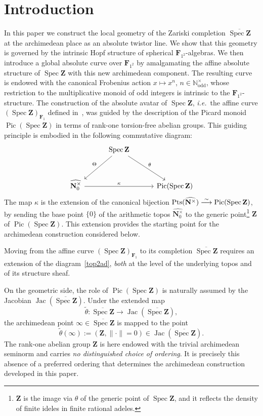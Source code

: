 \documentclass[11pt,a4paper]{article}
\newcommand{\N}{\mathbf{N}}
\newcommand{\Z}{\mathbf{Z}}
\newcommand{\Ftwo}{\mathbf{F}_{1^2}}
\def\spz{\Spec \Z}
\def\spzb{\overline{\Spec \Z}}
\def\spzf{(\Spec \Z)_{\mathbf{F}_{1}}}
\newcommand{\nat}{\widehat{\N^\times}}
\newcommand{\nato}{\widehat{\N^\times_0}}
\newcommand{\norm}{{\|\cdot\|}}
\newcommand{\Pt}{{\rm Pts}}
\newcommand{\Spec}{\operatorname{Spec}}
\newcommand{\Pic}{\operatorname{Pic}} \newcommand{\Jac}{\operatorname{Jac}}
\def\ie{{\it i.e.\/}\ }
\begin{document}
\section{Introduction}
In this paper we construct the local geometry of the Zariski completion
$\spzb$ at the archimedean place as an absolute twistor line. We show that
this geometry is governed by the intrinsic Hopf structure of spherical
$\Ftwo$-algebras. 
We then introduce a global absolute curve over $\Ftwo$ by amalgamating the
affine absolute structure of $\spz$ with this new archimedean component.
The resulting curve is endowed with the canonical Frobenius action
$
x\longmapsto x^n$, $n\in\mathbb N_{\mathrm{odd}}^{\times}
$, 
whose restriction to the multiplicative monoid of odd integers is intrinsic
to the $\Ftwo$-structure.
\newline
The construction of the absolute avatar of $\spz$, \ie the affine curve
$\spzf$ defined in~\cite{CC1}, was guided by the description of the Picard monoid
$\Pic(\spz)$ in terms of rank-one torsion-free abelian groups. This guiding
principle is embodied in the following commutative diagram:
\begin{equation}\label{top2ad}
\begin{tikzcd}[row sep=3em, column sep=3em]
&\spz \arrow[dl,"\Theta"']\arrow[dr,"\theta"] & \\
\nato \arrow[rr, "\kappa"]& & \Pic(\spz)
\end{tikzcd}
\end{equation}
The map $\kappa$
is the extension of the canonical bijection
$
\Pt(\nat)\stackrel{\sim}{\longrightarrow}\Pic(\spz)$, 
by sending the base point $\{0\}$ of the arithmetic topos $\nato$ to the generic point\footnote{$\Z$ is the image via $\theta$ of the generic point of $\spz$, and it reflects the density of finite ideles in finite rational adeles.}
$\Z$ of $\Pic(\spz)$. This extension provides the starting point for the
archimedean construction considered below.

Moving from the affine curve $\spzf$ to its completion $\spzb$
requires an extension of the diagram~\eqref{top2ad}, \emph{both} at the
level of the underlying topos and of its structure sheaf.

On the geometric side, the role of $\Pic(\spz)$ is naturally assumed by the
Jacobian $\Jac(\spzb)$. Under the extended map
\[
\tilde{\theta}:\spzb\longrightarrow\Jac(\spzb),
\]
the archimedean point
$
\infty\in\spzb
$
is mapped to the point
\[
\tilde\theta(\infty):=(\Z,\norm=0)\in\Jac(\spzb).
\]
The rank-one abelian group $\Z$ is here endowed with the trivial
archimedean seminorm and carries \emph{no distinguished choice of
ordering}. It is precisely this absence of a preferred ordering that determines the
archimedean construction developed in this paper.
\end{document}
